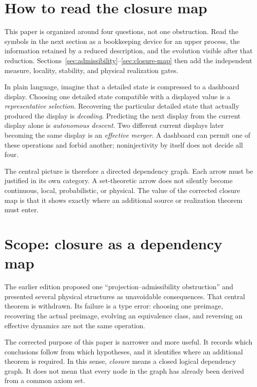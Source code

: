 \documentclass[11pt]{article}
\begin{document}
\tableofcontents

\section{How to read the closure map}

This paper is organized around four questions, not one obstruction.  Read the
symbols in the next section as a bookkeeping device for an upper process, the
information retained by a reduced description, and the evolution visible
after that reduction.  Sections~\ref{sec:admissibility}--\ref{sec:closure-map}
then add the independent measure, locality, stability, and physical
realization gates.

In plain language, imagine that a detailed state is compressed to a dashboard
display.  Choosing one detailed state compatible with a displayed value is a
\emph{representative selection}.  Recovering the particular detailed state
that actually produced the display is \emph{decoding}.  Predicting the next
display from the current display alone is \emph{autonomous descent}.  Two
different current displays later becoming the same display is an
\emph{effective merger}.  A dashboard can permit one of these operations and
forbid another; noninjectivity by itself does not decide all four.

The central picture is therefore a directed dependency graph.  Each arrow
must be justified in its own category.  A set-theoretic arrow does not
silently become continuous, local, probabilistic, or physical.  The value of
the corrected closure map is that it shows exactly where an additional source
or realization theorem must enter.

\section{Scope: closure as a dependency map}

The earlier edition proposed one ``projection--admissibility obstruction''
and presented several physical structures as unavoidable consequences.  That
central theorem is withdrawn.  Its failure is a type error: choosing one
preimage, recovering the actual preimage, evolving an equivalence class, and
reversing an effective dynamics are not the same operation.

The corrected purpose of this paper is narrower and more useful.  It records
which conclusions follow from which hypotheses, and it identifies where an
additional theorem is required.  In this sense, \emph{closure} means a closed
logical dependency graph.  It does not mean that every node in the graph has
already been derived from a common axiom set.
\end{document}
